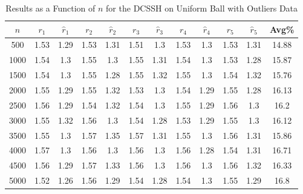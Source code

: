 \documentclass[11pt,twoside]{report}
\theoremstyle{definition}
\numberwithin{theorem}{section}
\numberwithin{definition}{section}
\numberwithin{lemma}{section}
\numberwithin{proposition}{section}
\numberwithin{equation}{section}
\numberwithin{figure}{section}
\begin{document}
\begin{appendices}
    \begin{table}[ht]
        \centering
        \begin{tabular}{|c||cc||cc||cc||cc||cc||c|} \hline
            $n$&$r_1$&$\hat{r}_1$&$r_2$&$\hat{r}_2$&$r_3$&$\hat{r}_3$&$r_4$&$\hat{r}_4$&$r_5$&$\hat{r}_5$&Avg\% \\ \hline
            500&1.53&1.29&1.53&1.31&1.51&1.3&1.53&1.3&1.53&1.31&14.88 \\
            1000&1.54&1.3&1.55&1.3&1.55&1.31&1.54&1.3&1.53&1.28&15.87 \\
            1500&1.54&1.3&1.55&1.28&1.55&1.32&1.55&1.3&1.54&1.32&15.76 \\
            2000&1.55&1.29&1.55&1.32&1.53&1.3&1.54&1.29&1.55&1.28&16.13 \\
            2500&1.56&1.29&1.54&1.32&1.54&1.3&1.55&1.29&1.56&1.3&16.2 \\
            3000&1.55&1.32&1.56&1.3&1.54&1.28&1.53&1.29&1.55&1.3&16.12 \\
            3500&1.55&1.3&1.57&1.35&1.57&1.31&1.55&1.3&1.56&1.31&15.86 \\
            4000&1.57&1.3&1.56&1.3&1.56&1.3&1.56&1.28&1.54&1.31&16.71 \\
            4500&1.56&1.29&1.57&1.33&1.56&1.3&1.56&1.3&1.56&1.32&16.33 \\
            5000&1.52&1.26&1.56&1.29&1.54&1.28&1.54&1.3&1.55&1.29&16.8 \\
        \end{tabular}
        \caption{Results as a Function of $n$ for the DCSSH on Uniform Ball with Outliers Data}
        \label{tab:uniform_ball_with_outliers_dcssh_table_n}
    \end{table}
    

\end{appendices}
\end{document}
